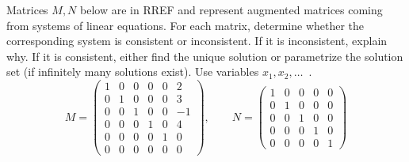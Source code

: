 \documentclass[12pt,letterpaper]{exam}
\begin{document}
\begin{questions}
\newpage
\question[15] Matrices $M, N$ below are in RREF and represent augmented matrices coming from systems of linear equations. For each matrix, determine whether the corresponding system is consistent or inconsistent. If it is inconsistent, explain why. If it is consistent, either find the unique solution or parametrize the solution set (if infinitely many solutions exist). Use variables $x_1, x_2, \ldots$\ . 
	\[
	M= \begin{pmatrix} 1 & 0 & 0 & 0 & 0 & 2 \\ 0 & 1 & 0 & 0 & 0 & 3 \\ 0 & 0 & 1 & 0 & 0 & -1 \\ 0 & 0 & 0 & 1 & 0 & 4 \\ 0 & 0 & 0 & 0 & 1 & 0 \\ 0 & 0 & 0 & 0 & 0 & 0 \end{pmatrix}, \qquad
	N= 
	\begin{pmatrix}
	1 & 0 & 0 & 0 & 0 \\
	0 & 1 & 0 & 0 & 0 \\
	0 & 0 & 1 & 0 & 0 \\
	0 & 0 & 0 & 1 & 0 \\
	0 & 0 & 0 & 0 & 1
	\end{pmatrix}
	\] \par\vspace{0.2cm}




\end{questions}
\end{document}
